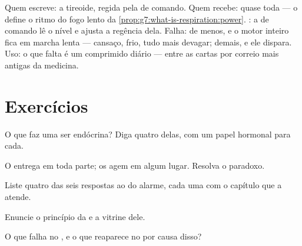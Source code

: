 \begin{example}\label{ex:g8:hormonal-communication:thyroid}
Quem escreve: a tireoide, regida pela  de comando. Quem
recebe: quase toda  --- o  define o ritmo do fogo lento
da \cref{prop:g7:what-is-respiration:power}. : a
 de comando lê o nível e ajusta a regência dela. Falha: de
menos, e o motor inteiro fica em marcha lenta --- cansaço, frio, tudo
mais devagar; demais, e ele dispara. Uso: o  que falta é um
comprimido diário --- entre as cartas por correio mais antigas da
medicina.
\end{example}

\section{Exercícios}

\begin{exercise}[$\star$]\label{exo:g8:hormonal-communication:1}
O que faz uma  ser endócrina? Diga quatro delas, com um papel
hormonal para cada.
\end{exercise}

\begin{exercise}[$\star$]\label{exo:g8:hormonal-communication:2}
O  entrega em toda parte; os  agem em algum lugar.
Resolva o paradoxo.
\end{exercise}

\begin{exercise}[$\star$]\label{exo:g8:hormonal-communication:3}
Liste quatro das seis respostas ao  do alarme, cada uma com o
capítulo que a atende.
\end{exercise}

\begin{exercise}[$\star$]\label{exo:g8:hormonal-communication:4}
Enuncie o princípio da  e a vitrine dele.
\end{exercise}

\begin{exercise}[$\star$]\label{exo:g8:hormonal-communication:5}
O que falha no , e o que reaparece no  por causa disso?
\end{exercise}

